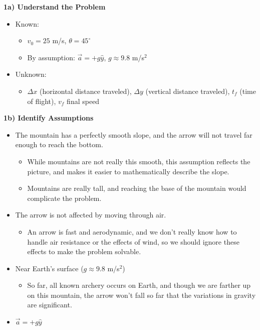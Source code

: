 \documentclass[]{article}
\begin{document}
\begin{TeacherMargin}
	\noindent\textbf{1a) Understand the Problem}
	\begin{itemize}
		\item Known:
		\begin{itemize}
			\item $v_{0}=25$ m/s, $\theta = 45^{\circ}$
			\item By assumption: $\vec{a}=+g\hat{y}$, $g\approx9.8$ m/s$^{2}$
		\end{itemize}
		\item Unknown:
		\begin{itemize}
			\item $\Delta x$ (horizontal distance traveled), $\Delta y$ (vertical distance traveled), $t_{f}$ (time of flight), $v_{f}$ final speed
		\end{itemize}
	\end{itemize}
	\noindent\textbf{1b) Identify Assumptions}
	\begin{itemize}
		\item The mountain has a perfectly smooth slope, and the arrow will not travel far enough to reach the bottom.
		\begin{itemize}
			\item While mountains are not really this smooth, this assumption reflects the picture, and makes it easier to mathematically describe the slope.
			\item Mountains are really tall, and reaching the base of the mountain would complicate the problem.
		\end{itemize}
		\item The arrow is not affected by moving through air.
		\begin{itemize}
			\item An arrow is fast and aerodynamic, and we don't really know how to handle air resistance or the effects of wind, so we should ignore these effects to make the problem solvable.
		\end{itemize}
		\item Near Earth's surface ($g\approx9.8$ m/s$^{2}$)
		\begin{itemize}
			\item So far, all known archery occurs on Earth, and though we are farther up on this mountain, the arrow won't fall so far that the variations in gravity are significant.
		\end{itemize}
		\item $\vec{a}=+g\hat{y}$
		\begin{itemize}

\end{itemize}
\end{itemize}
\end{TeacherMargin}
\end{document}
